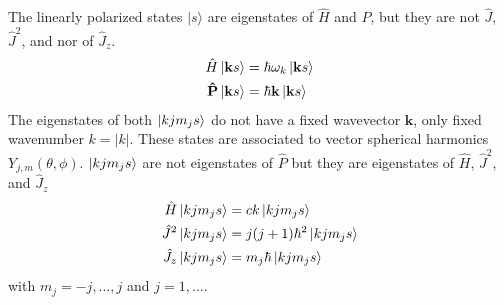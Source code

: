 \documentclass[../../../main.tex]{subfiles}
\begin{document}
The linearly polarized states \(|s\rangle\)  are eigenstates of \( \hat{H} \) and \( \hat{P} \), but they are not  \( \hat{J} \), \( \hat{J}^2 \), and nor of \( \hat{J}_z \).
\begin{align*}
  \hat{H} \ket{\mathbf{k }s}         & =  \hbar \omega_k \ket{\mathbf{k }s} \\
  \mathbf{\hat{P}} \ket{\mathbf{k}s} & = \hbar \mathbf{k }\ket{\mathbf{k}s}
\end{align*}
The eigenstates of both \(\ket{kjm_js}\) do not have a fixed wavevector \( \mathbf{k} \), only  fixed wavenumber \( k = |k| \).
These states are associated to vector spherical harmonics \( Y_{j,m}(\theta, \phi) \).
\(\ket{kjm_js}\) are not eigenstates of \( \hat{P} \) but they are eigenstates of \( \hat{H} \), \( \hat{J}^2 \), and \( \hat{J}_z \)
\begin{align*}
  \hat{H}\ket{kjm_js}    & =  c k \ket{kjm_js}             \\
  \hat{J}^2 \ket{kjm_js} & =  j(j + 1)\hbar^2 \ket{kjm_js} \\
  \hat{J}_z \ket{kjm_js} & =  m_j \hbar \ket{kjm_js}       \\
\end{align*}
with $m_j=-j,\dots,j$ and $j=1,\dots$.
\end{document}
